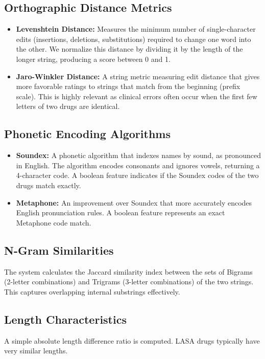 \documentclass[12pt,a4paper]{report}
\begin{document}
\subsection{Orthographic Distance Metrics}
\begin{itemize}
    \item \textbf{Levenshtein Distance:} Measures the minimum number of single-character edits (insertions, deletions, substitutions) required to change one word into the other. We normalize this distance by dividing it by the length of the longer string, producing a score between 0 and 1.
    \item \textbf{Jaro-Winkler Distance:} A string metric measuring edit distance that gives more favorable ratings to strings that match from the beginning (prefix scale). This is highly relevant as clinical errors often occur when the first few letters of two drugs are identical.
\end{itemize}

\subsection{Phonetic Encoding Algorithms}
\begin{itemize}
    \item \textbf{Soundex:} A phonetic algorithm that indexes names by sound, as pronounced in English. The algorithm encodes consonants and ignores vowels, returning a 4-character code. A boolean feature indicates if the Soundex codes of the two drugs match exactly.
    \item \textbf{Metaphone:} An improvement over Soundex that more accurately encodes English pronunciation rules. A boolean feature represents an exact Metaphone code match.
\end{itemize}

\subsection{N-Gram Similarities}
The system calculates the Jaccard similarity index between the sets of Bigrams (2-letter combinations) and Trigrams (3-letter combinations) of the two strings. This captures overlapping internal substrings effectively.

\subsection{Length Characteristics}
A simple absolute length difference ratio is computed. LASA drugs typically have very similar lengths.
\end{document}

